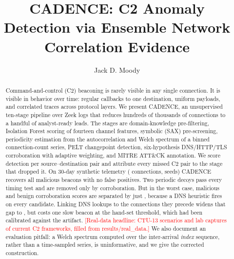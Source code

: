 \documentclass[runningheads]{llncs}
\newcommand{\pending}[1]{\textcolor{red}{[#1]}}
\begin{document}
\title{CADENCE: C2 Anomaly Detection via Ensemble Network Correlation Evidence}
\author{Jack D. Moody}

\maketitle

\begin{abstract}
Command-and-control (C2) beaconing is rarely visible in any single connection. It is visible in behavior over time: regular callbacks to one destination, uniform payloads, and correlated traces across protocol layers. We present CADENCE, an unsupervised ten-stage pipeline over Zeek logs that reduces hundreds of thousands of connections to a handful of analyst-ready leads. The stages are domain-knowledge pre-filtering, Isolation Forest scoring of fourteen channel features, symbolic (SAX) pre-screening, periodicity estimation from the autocorrelation and Welch spectrum of a binned connection-count series, PELT changepoint detection, six-hypothesis DNS/HTTP/TLS corroboration with adaptive weighting, and MITRE ATT\&CK annotation. We score detection per source--destination pair and attribute every missed C2 pair to the stage that dropped it. On 30-day synthetic telemetry (\SynRows{} connections, \SynSeeds{} seeds) CADENCE recovers all \SynMalPairs{} malicious beacons with no false positives. Two periodic decoys pass every timing test and are removed only by corroboration. But in the worst case, malicious and benign corroboration scores are separated by just \HostMargin{}, because a DNS heuristic fires on every candidate. Linking DNS lookups to the connections they precede widens that gap to \LinkedMargin{}, but costs one slow beacon at the hand-set threshold, which had been calibrated against the artifact. \pending{Real-data headline: CTU-13 scenarios and lab captures of current C2 frameworks, filled from results/real\_data.} We also document an evaluation pitfall: a Welch spectrum computed over the inter-arrival \emph{index} sequence, rather than a time-sampled series, is uninformative, and we give the corrected construction.
\end{abstract}
\end{document}
